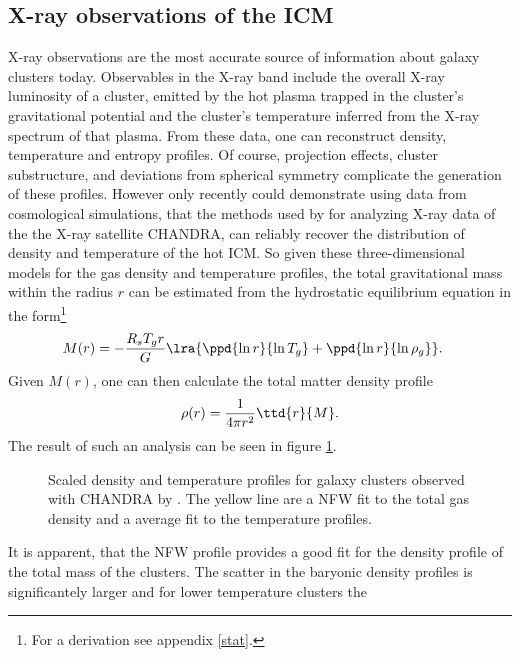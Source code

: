 \subsection{X-ray observations of the ICM}
X-ray observations are the most accurate source of information about galaxy
clusters today. Observables in the X-ray band include the overall X-ray
luminosity of a cluster, emitted by the hot plasma trapped
in the cluster’s gravitational potential and the cluster’s temperature inferred
from the X-ray spectrum of that plasma. From these data, one can reconstruct
density, temperature and entropy profiles. Of course, projection effects,
cluster substructure, and deviations from spherical symmetry complicate the
generation of these profiles. However only recently \citet{Nagai2007}
could demonstrate using data from cosmological simulations, that the methods
used by \citet{Vikhlinin2006} for analyzing X-ray data of the the
X-ray satellite CHANDRA, can reliably recover the distribution of density and
temperature of the hot ICM.  So given these three-dimensional models for the gas
density and temperature profiles, the total gravitational mass within the radius
$r$ can be estimated from the hydrostatic equilibrium equation in the
form\footnote{For a derivation see appendix \ref{stat}.} 
\begin{align}
M(r) &= - \frac{R_s T_g r}{G} \lra{\ppd{\ln r}{\ln T_g}+\ppd{\ln r}{\ln
\rho_g}}.
\end{align}
Given $M(r)$, one can then calculate the total
matter density profile
\begin{align}
\rho(r)=\frac{1}{4\pi r^2} \ttd{r}{M}. 
\end{align}
The result of such an analysis \citep{Vikhlinin2006} can be seen in figure
\ref{fig:profiles}. 
\begin{figure}[tp]
	\centering
	\caption{Scaled density and temperature profiles for galaxy clusters
	observed with CHANDRA by \citep{Vikhlinin2006}. The yellow line are a NFW
	fit to the total gas density and a average fit to the temperature profiles.}
	\label{fig:profiles}
\end{figure}
It is apparent, that the NFW profile provides a good fit for the density
profile of the total mass of the clusters. The scatter in the baryonic density 
profiles is significantely larger and for lower temperature clusters the
